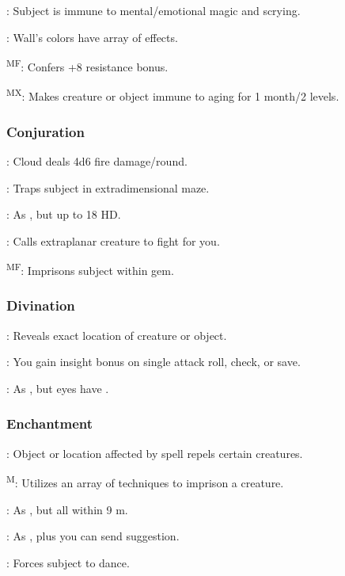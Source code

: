 	: Subject is immune to mental/emotional magic and scrying.

	: Wall's colors have array of effects.

	\textsuperscript{MF}: Confers +8 resistance bonus.

	\textsuperscript{MX}: Makes creature or object immune to aging for 1 month/2 levels. %

\subsubsection{Conjuration}
	: Cloud deals 4d6 fire damage/round.

	: Traps subject in extradimensional maze.

	: As , but up to 18 HD.

	: Calls extraplanar creature to fight for you.

	\textsuperscript{MF}: Imprisons subject within gem.

\subsubsection{Divination}
	: Reveals exact location of creature or object.

	: You gain insight bonus on single attack roll, check, or save.

	: As , but eyes have .

\subsubsection{Enchantment}
	: Object or location affected by spell repels certain creatures.

	\textsuperscript{M}: Utilizes an array of techniques to imprison a creature.

	: As , but all within 9 m.

	: As , plus you can send suggestion.

	: Forces subject to dance.

